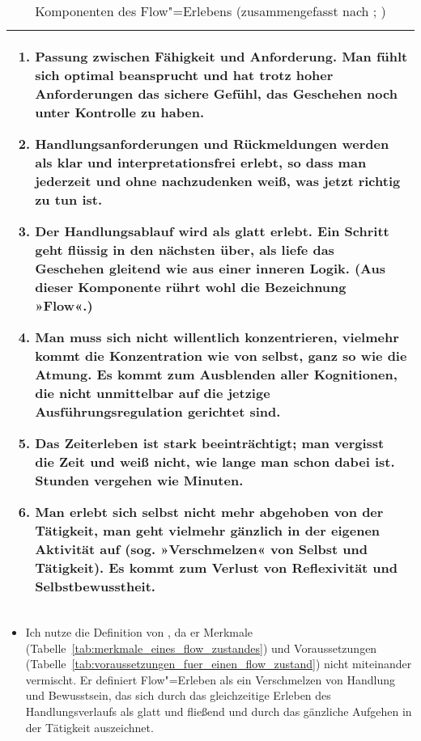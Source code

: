 \begin{table}
	[!htb] \caption[Komponenten des Flow"=Erlebens]{Komponenten des Flow"=Erlebens (zusammengefasst nach \citet{Csikszentmihalyi2010}; \citep[S.~153ff]{Rheinberg2008})} \label{tab:komponenten_des_flow_erlebens} 
	\begin{tabularx}
		{ 
		\textwidth}{X} \midrule \begin{enumerate}

	\item Passung zwischen Fähigkeit und Anforderung. Man fühlt sich optimal beansprucht und hat trotz hoher Anforderungen das sichere Gefühl, das Geschehen noch unter Kontrolle zu haben. 

			\item Handlungsanforderungen und Rückmeldungen werden als klar und interpretationsfrei erlebt, so dass man jederzeit und ohne nachzudenken weiß, was jetzt richtig zu tun ist. 

			\item Der Handlungsablauf wird als glatt erlebt. Ein Schritt geht flüssig in den nächsten über, als liefe das Geschehen gleitend wie aus einer inneren Logik. (Aus dieser Komponente rührt wohl die Bezeichnung »Flow«.) 

			\item Man muss sich nicht willentlich konzentrieren, vielmehr kommt die Konzentration wie von selbst, ganz so wie die Atmung. Es kommt zum Ausblenden aller Kognitionen, die nicht unmittelbar auf die jetzige Ausführungsregulation gerichtet sind. 

			\item Das Zeiterleben ist stark beeinträchtigt; man vergisst die Zeit und weiß nicht, wie lange man schon dabei ist. Stunden vergehen wie Minuten. 

			\item Man erlebt sich selbst nicht mehr abgehoben von der Tätigkeit, man geht vielmehr gänzlich in der eigenen Aktivität auf (sog. »Verschmelzen« von Selbst und Tätigkeit). Es kommt zum Verlust von Reflexivität und Selbstbewusstheit. 

\end{enumerate} \\

		\bottomrule 
	\end{tabularx}
\end{table}
\begin{itemize}
	
	\item Ich nutze die Definition von \citet{Henk2014}, da er Merkmale (Tabelle~\ref{tab:merkmale_eines_flow_zustandes}) und Voraussetzungen (Tabelle~\ref{tab:voraussetzungen_fuer_einen_flow_zustand}) nicht miteinander vermischt. Er definiert Flow"=Erleben als ein Verschmelzen von Handlung und Bewusstsein, das sich durch das gleichzeitige Erleben des Handlungsverlaufs als glatt und fließend und durch das gänzliche Aufgehen in der Tätigkeit auszeichnet. 
\end{itemize}


